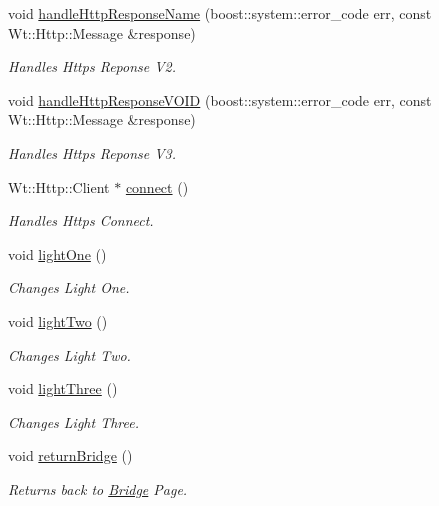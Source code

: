 \begin{DoxyCompactItemize}
void \hyperlink{classSingleSchedulerControlWidget_ab4aff107cf49bdae8ba7c5650297e78e}{handle\+Http\+Response\+Name} (boost\+::system\+::error\+\_\+code err, const Wt\+::\+Http\+::\+Message \&response)
\begin{DoxyCompactList}\small\item\em Handles Https Reponse V2. \end{DoxyCompactList}\item 
void \hyperlink{classSingleSchedulerControlWidget_a8058b8110567576b3abd02142f09a793}{handle\+Http\+Response\+V\+O\+ID} (boost\+::system\+::error\+\_\+code err, const Wt\+::\+Http\+::\+Message \&response)
\begin{DoxyCompactList}\small\item\em Handles Https Reponse V3. \end{DoxyCompactList}\item 
Wt\+::\+Http\+::\+Client $\ast$ \hyperlink{classSingleSchedulerControlWidget_a88870dd05404fcda5613c04e87eddba6}{connect} ()
\begin{DoxyCompactList}\small\item\em Handles Https Connect. \end{DoxyCompactList}\item 
void \hyperlink{classSingleSchedulerControlWidget_aae736f1da5036a5edaaacbb084c92f29}{light\+One} ()
\begin{DoxyCompactList}\small\item\em Changes Light One. \end{DoxyCompactList}\item 
void \hyperlink{classSingleSchedulerControlWidget_a23b450759aa7ed01b811e286d06f4ba7}{light\+Two} ()
\begin{DoxyCompactList}\small\item\em Changes Light Two. \end{DoxyCompactList}\item 
void \hyperlink{classSingleSchedulerControlWidget_a48138931a6f168024aa5fa8523378714}{light\+Three} ()
\begin{DoxyCompactList}\small\item\em Changes Light Three. \end{DoxyCompactList}\item 
void \hyperlink{classSingleSchedulerControlWidget_af53d54694b006e60898b7b6aa3f85ae8}{return\+Bridge} ()
\begin{DoxyCompactList}\small\item\em Returns back to \hyperlink{classBridge}{Bridge} Page. \end{DoxyCompactList}\item 

\end{DoxyCompactItemize}
